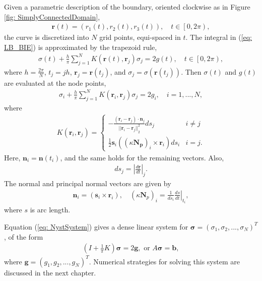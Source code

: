 \documentclass{sfuthesis}
\begin{document}
Given a parametric description of the boundary, oriented clockwise as in Figure \ref{fig: SimplyConnectedDomain}, 
\begin{align*}
	\mathbf{r}(t)=(r_1(t), r_2(t), r_3(t)), \quad t\in\left[0,2\pi\right),
\end{align*}
the curve is discretized into $N$ grid points, equi-spaced in $t$. The integral in (\ref{eq: LB_BIE}) is approximated by the trapezoid rule, 
\begin{align}
	\sigma(t)+\frac{h}{\pi}\sum_{j=1}^NK(\mathbf{r}(t),\mathbf{r}_j)\sigma_j=2g(t), \quad t\in\left[0,2\pi\right), \label{eq: NIF}
\end{align}
where $h=\frac{2\pi}{N}$, $t_j=jh$, $\mathbf{r}_j=\mathbf{r}(t_j)$, and ${\sigma}_j=\sigma(\mathbf{r}(t_j))$. 
Then $\sigma(t)$ and $g(t)$ are evaluated at the node points, 
\begin{align}
	{\sigma}_i+\frac{h}{\pi}\sum_{j=1}^NK(\mathbf{r}_i, \mathbf{r}_j){\sigma}_j=2g_i, \quad i=1,...,N, \label{eq: NystSystem} 
\end{align}
where 
\begin{align*}
	K(\mathbf{r}_i, \mathbf{r}_j)=\begin{cases} 
      		-\frac{(\mathbf{r}_i-\mathbf{r}_j)\cdot\mathbf{n}_j}{{||\mathbf{r}_i-\mathbf{r}_j||}_2^2}ds_j & i\neq j \\
      		\frac{1}{2}\mathbf{s}_i\left(\left(\kappa \mathbf{N_p}\right)_i \times \mathbf{r}_i\right)ds_i & i=j .
        \end{cases}
\end{align*}
Here, $\mathbf{n}_i=\mathbf{n}(t_i)$, and the same holds for the remaining vectors. Also, 
\begin{align*}
	ds_j={\left|\frac{d\mathbf{r}}{dt}\right|}_j. 
\end{align*}
The normal and principal normal vectors are given by
\begin{align*}
	\mathbf{n}_i=(\mathbf{s}_i\times \mathbf{r}_i), \quad \left(\kappa \mathbf{N}_{p}\right)_i=\frac{1}{ds_i} \left.\frac{ds}{dt} \right|_{t_i}, 
\end{align*}
where $s$ is arc length. 

Equation (\ref{eq: NystSystem}) gives a dense linear system for $\bm{\sigma}={(\sigma_1,\sigma_2,...,\sigma_N)}^T$, of the form 
\begin{align}
	\left(I+\frac{1}{\pi}K\right)\bm{\sigma}=2\mathbf{g}, \text{ or } A\bm{\sigma}=\mathbf{b}, \label{eq: LBSystem} 
\end{align}
where $\mathbf{g}={(g_1, g_2, ..., g_N)}^T$. 
Numerical strategies for solving this system are discussed in the next chapter.
\end{document}
